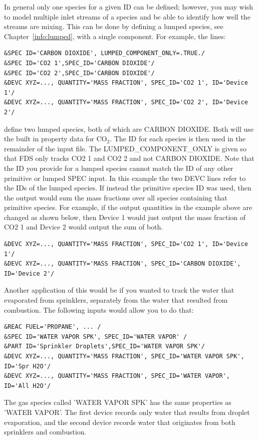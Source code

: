 \documentclass[11pt]{book}
\begin{document}
In general only one species for a given {\ct ID} can be defined; however, you may wish to model multiple inlet streams of a species and be able to identify how well the streams are mixing.  This can be done by defining a lumped species, see Chapter~\ref{info:lumped}, with a single component.  For example, the lines:
\begin{lstlisting}
&SPEC ID='CARBON DIOXIDE', LUMPED_COMPONENT_ONLY=.TRUE./
&SPEC ID='CO2 1',SPEC_ID='CARBON DIOXIDE'/
&SPEC ID='CO2 2',SPEC_ID='CARBON DIOXIDE'/
&DEVC XYZ=..., QUANTITY='MASS FRACTION', SPEC_ID='CO2 1', ID='Device 1'/
&DEVC XYZ=..., QUANTITY='MASS FRACTION', SPEC_ID='CO2 2', ID='Device 2'/
\end{lstlisting}
define two lumped species, both of which are {\ct CARBON DIOXIDE}.  Both will use the built in property data for CO$_2$.  The {\ct ID} for each species is then used in the remainder of the input file.  The {\ct LUMPED\_COMPONENT\_ONLY} is given so that FDS only tracks {\ct CO2 1} and {\ct CO2 2} and not {\ct CARBON DIOXIDE}.  Note that the {\ct ID} you provide for a lumped species cannot match the {\ct ID} of any other primitive or lumped {\ct SPEC} input.  In this example the two {\ct DEVC} lines refer to the {\ct ID}s of the lumped species.  If instead the primitive species {\ct ID} was used, then the output would sum the mass fractions over all species containing that primitive species.  For example, if the output quantities in the example above are changed as shown below, then {\ct Device 1} would just output the mass fraction of {\ct CO2 1} and {\ct Device 2} would output the sum of both.
\begin{lstlisting}
&DEVC XYZ=..., QUANTITY='MASS FRACTION', SPEC_ID='CO2 1', ID='Device 1'/
&DEVC XYZ=..., QUANTITY='MASS FRACTION', SPEC_ID='CARBON DIOXIDE', ID='Device 2'/
\end{lstlisting}
Another application of this would be if you wanted to track the water that evaporated from sprinklers, separately from the water
that resulted from combustion.  The following inputs would allow you to do that:
\begin{lstlisting}
&REAC FUEL='PROPANE', ... /
&SPEC ID='WATER VAPOR SPK', SPEC_ID='WATER VAPOR' /
&PART ID='Sprinkler Droplets',SPEC_ID='WATER VAPOR SPK'/
&DEVC XYZ=..., QUANTITY='MASS FRACTION', SPEC_ID='WATER VAPOR SPK', ID='Spr H2O'/
&DEVC XYZ=..., QUANTITY='MASS FRACTION', SPEC_ID='WATER VAPOR', ID='All H2O'/
\end{lstlisting}
The gas species called {\ct 'WATER VAPOR SPK'} has the same properties as {\ct 'WATER VAPOR'}. The first device records only water that results from droplet evaporation, and the second device records water that originates from both sprinklers and combustion.
\end{document}
